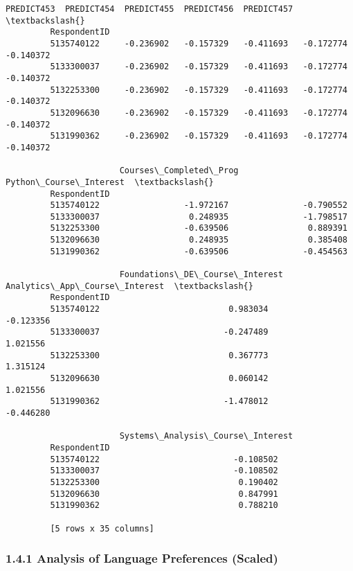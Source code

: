 \documentclass[11pt]{article}
\begin{document}
\begin{Verbatim}[commandchars=\\\{\}]
                       PREDICT453  PREDICT454  PREDICT455  PREDICT456  PREDICT457  \textbackslash{}
         RespondentID                                                               
         5135740122     -0.236902   -0.157329   -0.411693   -0.172774   -0.140372   
         5133300037     -0.236902   -0.157329   -0.411693   -0.172774   -0.140372   
         5132253300     -0.236902   -0.157329   -0.411693   -0.172774   -0.140372   
         5132096630     -0.236902   -0.157329   -0.411693   -0.172774   -0.140372   
         5131990362     -0.236902   -0.157329   -0.411693   -0.172774   -0.140372   
         
                       Courses\_Completed\_Prog  Python\_Course\_Interest  \textbackslash{}
         RespondentID                                                   
         5135740122                 -1.972167               -0.790552   
         5133300037                  0.248935               -1.798517   
         5132253300                 -0.639506                0.889391   
         5132096630                  0.248935                0.385408   
         5131990362                 -0.639506               -0.454563   
         
                       Foundations\_DE\_Course\_Interest  Analytics\_App\_Course\_Interest  \textbackslash{}
         RespondentID                                                                  
         5135740122                          0.983034                      -0.123356   
         5133300037                         -0.247489                       1.021556   
         5132253300                          0.367773                       1.315124   
         5132096630                          0.060142                       1.021556   
         5131990362                         -1.478012                      -0.446280   
         
                       Systems\_Analysis\_Course\_Interest  
         RespondentID                                    
         5135740122                           -0.108502  
         5133300037                           -0.108502  
         5132253300                            0.190402  
         5132096630                            0.847991  
         5131990362                            0.788210  
         
         [5 rows x 35 columns]
\end{Verbatim}
            
    \hypertarget{analysis-of-language-preferences-scaled}{%
\subsubsection{1.4.1\textbar{} Analysis of Language Preferences
(Scaled)}\label{analysis-of-language-preferences-scaled}}
\end{document}
